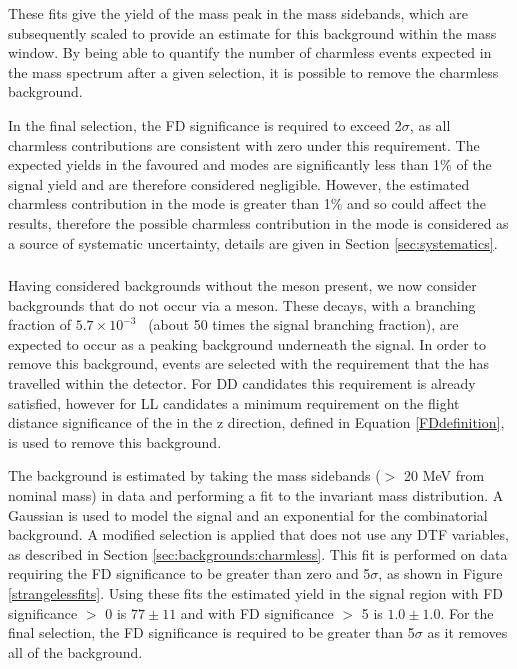 These fits give the yield of the \Bm mass peak in the \Dz mass sidebands, which are subsequently scaled to provide an estimate for this background within the \Dz mass window. By being able to quantify the number of charmless events expected in the \Bm mass spectrum after a given selection, it is possible to remove the charmless background. 

In the final selection, the \Dz FD significance is required to exceed 2$\sigma$, as all charmless contributions are consistent with zero under this requirement. The expected yields in the \kpi favoured and \kk modes are significantly less than 1\% of the signal yield and are therefore considered negligible. However, the estimated charmless contribution in the \pipi mode is greater than 1\% and so could affect the results, therefore the possible charmless contribution in the \pipi mode is considered as a source of systematic uncertainty, details are given in Section \ref{sec:systematics}. 

\subsubsection{\boldmath \decay{\Bm}{\D\pim\pip\pim}}
\label{sec:backgrounds:b2dpipipi}

Having considered backgrounds without the \Dz meson present, we now consider backgrounds that do not occur via a \KS meson. These \decay{\Bm}{\D\pim\pip\pim} decays, with a branching fraction of $5.7 \times 10^{-3}$~\cite{PDG2014} (about 50 times the signal \decay{\Bm}{\D\Kstarm(\KS(\pip\pim)\pim)} branching fraction), are expected to occur as a peaking background underneath the signal. In order to remove this background, events are selected with the requirement that the \KS has travelled within the detector. For DD candidates this requirement is already satisfied, however for LL candidates a minimum requirement on the flight distance significance of the \KS in the z direction, defined in Equation \ref{FDdefinition}, is used to remove this background. 

The \decay{\Bm}{\D\pim\pip\pim} background is estimated by taking the \KS mass sidebands ($>$ 20 MeV from nominal \KS mass) in data and performing a fit to the invariant \Bm mass distribution. A Gaussian is used to model the signal and an exponential for the combinatorial background. A modified selection is applied that does not use any DTF variables, as described in Section \ref{sec:backgrounds:charmless}. This fit is performed on \kpi data requiring the \KS FD significance to be greater than zero and 5$\sigma$, as shown in Figure \ref{strangelessfits}. Using these fits the estimated \decay{\B}{\D\pi\pi\pi} yield in the signal region with \KS FD significance $>$ 0 is $77 \pm 11$ and with \KS FD significance $>$ 5 is $1.0 \pm 1.0$. For the final selection, the FD significance is required to be greater than 5$\sigma$ as it removes all of the \decay{\Bm}{\D\pim\pip\pim} background.


